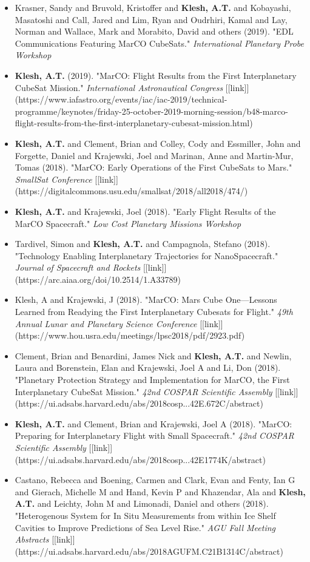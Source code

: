 \documentclass[11pt,letterpaper]{article}
\begin{document}
\begin{itemize}
\item Krasner, Sandy and Bruvold, Kristoffer and \textbf{Klesh, A.T.} and Kobayashi, Masatoshi and Call, Jared and Lim, Ryan and Oudrhiri, Kamal and Lay, Norman and Wallace, Mark and Morabito, David and others (2019). "EDL Communications Featuring MarCO CubeSats." \textit{International Planetary Probe Workshop}
\item \textbf{Klesh, A.T.} (2019). "MarCO: Flight Results from the First Interplanetary CubeSat Mission." \textit{International Astronautical Congress} [[link]](https://www.iafastro.org/events/iac/iac-2019/technical-programme/keynotes/friday-25-october-2019-morning-session/b48-marco-flight-results-from-the-first-interplanetary-cubesat-mission.html)
\item \textbf{Klesh, A.T.} and Clement, Brian and Colley, Cody and Essmiller, John and Forgette, Daniel and Krajewski, Joel and Marinan, Anne and Martin-Mur, Tomas (2018). "MarCO: Early Operations of the First CubeSats to Mars." \textit{SmallSat Conference} [[link]](https://digitalcommons.usu.edu/smallsat/2018/all2018/474/)
\item \textbf{Klesh, A.T.} and Krajewski, Joel (2018). "Early Flight Results of the MarCO Spacecraft." \textit{Low Cost Planetary Missions Workshop}
\item Tardivel, Simon and \textbf{Klesh, A.T.} and Campagnola, Stefano (2018). "Technology Enabling Interplanetary Trajectories for NanoSpacecraft." \textit{Journal of Spacecraft and Rockets} [[link]](https://arc.aiaa.org/doi/10.2514/1.A33789)
\item Klesh, A and Krajewski, J (2018). "MarCO: Mars Cube One---Lessons Learned from Readying the First Interplanetary Cubesats for Flight." \textit{49th Annual Lunar and Planetary Science Conference} [[link]](https://www.hou.usra.edu/meetings/lpsc2018/pdf/2923.pdf)
\item Clement, Brian and Benardini, James Nick and \textbf{Klesh, A.T.} and Newlin, Laura and Borenstein, Elan and Krajewski, Joel A and Li, Don (2018). "Planetary Protection Strategy and Implementation for MarCO, the First Interplanetary CubeSat Mission." \textit{42nd COSPAR Scientific Assembly} [[link]](https://ui.adsabs.harvard.edu/abs/2018cosp...42E.672C/abstract)
\item \textbf{Klesh, A.T.} and Clement, Brian and Krajewski, Joel A (2018). "MarCO: Preparing for Interplanetary Flight with Small Spacecraft." \textit{42nd COSPAR Scientific Assembly} [[link]](https://ui.adsabs.harvard.edu/abs/2018cosp...42E1774K/abstract)
\item Castano, Rebecca and Boening, Carmen and Clark, Evan and Fenty, Ian G and Gierach, Michelle M and Hand, Kevin P and Khazendar, Ala and \textbf{Klesh, A.T.} and Leichty, John M and Limonadi, Daniel and others (2018). "Heterogenous System for In Situ Measurements from within Ice Shelf Cavities to Improve Predictions of Sea Level Rise." \textit{AGU Fall Meeting Abstracts} [[link]](https://ui.adsabs.harvard.edu/abs/2018AGUFM.C21B1314C/abstract)

\end{itemize}
\end{document}
